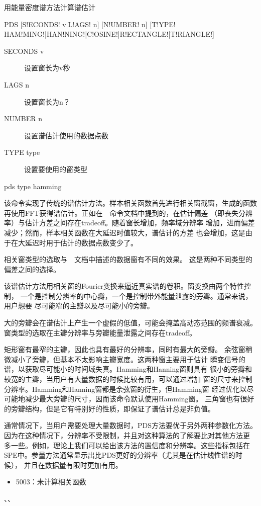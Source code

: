 \label{spe:pdf}

用能量密度谱方法计算谱估计

\begin{SACSTX}
PDS [S!ECONDS! v|L!AGS! n] [N!UMBER! n]
    [T!YPE! HAM!MING!|HAN!NING!|C!OSINE!|R!ECTANGLE!|T!RIANGLE!]
\end{SACSTX}

\begin{description}
\item [SECONDS v] 设置窗长为v秒
\item [LAGS n] 设置窗长为n？
\item [NUMBER n] 设置谱估计使用的数据点数
\item [TYPE type] 设置要使用的窗类型
\end{description}

\begin{SACDFT}
pds type hamming
\end{SACDFT}

该命令实现了传统的谱估计方法。样本相关函数首先进行相关窗截窗，生成的函数
再使用FFT获得谱估计。正如在~~命令文档中提到的，在估计偏差
（即丧失分辨率）与估计方差之间存在tradeoff。随着窗长增加，频率域分辨率
增加，进而偏差减少；然而，样本相关函数在大延迟时值较大，谱估计的方差
也会增加，这是由于在大延迟时用于估计的数据点数变少了。

相关窗类型的选取与~~文档中描述的数据窗有不同的效果。
这是两种不同类型的偏差之间的选择。

该谱估计方法用相关窗的Fourier变换来逼近真实谱的卷积。窗变换由两个特性控制，
一个是控制分辨率的中心瓣，一个是控制带外能量泄露的旁瓣。通常来说，用户想要
尽可能窄的主瓣以及尽可能小的旁瓣。

大的旁瓣会在谱估计上产生一个虚假的低值，可能会掩盖高动态范围的频谱衰减。
窗类型的选取在主瓣分辨率与旁瓣能量泄露之间存在tradeoff。

矩形窗有最窄的主瓣，因此也具有最好的分辨率，同时有最大的旁瓣。
余弦窗稍微减小了旁瓣，但基本不太影响主瓣宽度。这两种窗主要用于估计
瞬变信号的谱，以获取尽可能小的时间域失真。Hamming和Hanning窗则具有
很小的旁瓣和较宽的主瓣，当用户有大量数据的时候比较有用，可以通过增加
窗的尺寸来控制分辨率。Hamming和Hanning窗都是余弦窗的衍生，但Hamming窗
经过优化以尽可能地减少最大旁瓣的尺寸，因而该命令默认使用Hamming窗。
三角窗也有很好的旁瓣结构，但是它有特别好的性质，即保证了谱估计总是非负值。

通常情况下，当用户需要处理大量数据时，PDS方法要优于另外两种参数化方法。
因为在这种情况下，分辨率不受限制，并且对这种算法的了解要比对其他方法更
多一些。例如，理论上我们可以给出该方法的置信度和分辨率。这些指标包括在
SPE中。参量方法通常显示出比PDS更好的分辨率（尤其是在估计线性谱的时候），
并且在数据量有限时更加有用。

\begin{itemize}
\item 5003：未计算相关函数
\end{itemize}

、、
